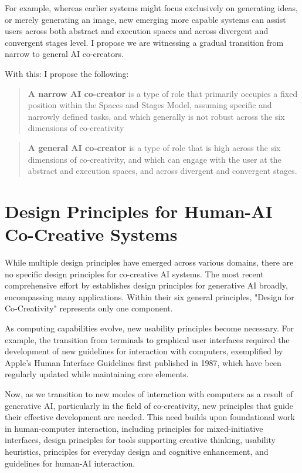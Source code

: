 For example, whereas earlier systems might focus exclusively on generating ideas, or merely generating an image, new emerging more capable systems can assist users across both abstract and execution spaces and across divergent and convergent stages level. I propose we are witnessing a gradual transition from narrow to general AI co-creators.

With this: I propose the following: 

\begin{quote}
    \textbf{A narrow AI co-creator} is a type of role that primarily occupies a fixed position within the Spaces and Stages Model, assuming specific and narrowly defined tasks, and which generally is not robust across the six dimensions of co-creativity
\end{quote}

\begin{quote}
    \textbf{A general AI co-creator} is a type of role that is high across the six dimensions of co-creativity, and which can engage with the user at the abstract and execution spaces, and across divergent and convergent stages. 
\end{quote}




\section{Design Principles for Human-AI Co-Creative Systems}

While multiple design principles have emerged across various domains, there are no specific design principles for co-creative AI systems. The most recent comprehensive effort by \cite{Weisz2024-io} establishes design principles for generative AI broadly, encompassing many applications. Within their six general principles, "Design for Co-Creativity" represents only one component.

As computing capabilities evolve, new usability principles become necessary. For example, the transition from terminals to graphical user interfaces required the development of new guidelines for interaction with computers, exemplified by Apple's Human Interface Guidelines first published in 1987, which have been regularly updated while maintaining core elements.

Now, as we transition to new modes of interaction with computers as a result of generative AI, particularly in the field of co-creativity, new principles that guide their effective development are needed. This need builds upon foundational work in human-computer interaction, including \cite{Horvitz1999-wh} principles for mixed-initiative interfaces, \cite{Resnick2005-fs} design principles for tools supporting creative thinking, \cite{Nielsen1994-df} usability heuristics, \cite{Norman2013-hs, Norman1994-kz} principles for everyday design and cognitive enhancement, and \cite{Amershi2019-vy} guidelines for human-AI interaction.

